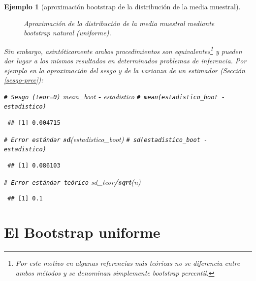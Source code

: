 \documentclass[
  spanish,
  10pt,
]{book}
\newenvironment{Shaded}{\begin{snugshade}}{\end{snugshade}}
\newcommand{\CommentTok}[1]{\textcolor[rgb]{0.56,0.35,0.01}{\textit{#1}}}
\newcommand{\FunctionTok}[1]{\textcolor[rgb]{0.13,0.29,0.53}{\textbf{#1}}}
\newcommand{\NormalTok}[1]{#1}
\newcommand{\SpecialCharTok}[1]{\textcolor[rgb]{0.81,0.36,0.00}{\textbf{#1}}}
\theoremstyle{break}
\newtheorem{example}{Ejemplo}[chapter]
\theoremstyle{nonumberplain}
\renewcommand{\CommentTok}[1]{\textcolor[rgb]{0.41,0.41,0.41}{\texttt{#1}}}
\let\oldfootnote\footnote
\renewcommand\footnote[1]{\oldfootnote{\hspace{2mm}#1}}
\begin{document}
\begin{example}[aproximación bootstrap de la distribución de la media muestral]
\begin{figure}[!htbp]
{}

\caption{Aproximación de la distribución de la media muestral mediante bootstrap natural (uniforme).}\label{fig:mean-boot-basico}
\end{figure}

Sin embargo, asintóticamente ambos procedimientos son equivalentes\footnote{Por este motivo en algunas referencias más teóricas no se diferencia entre ambos métodos y se denominan simplemente bootstrap percentil.} y pueden dar lugar a los mismos resultados en determinados problemas de inferencia.
Por ejemplo en la aproximación del sesgo y de la varianza de un estimador (Sección \ref{sesgo-prec}):

\begin{Shaded}
\begin{Highlighting}[]
\CommentTok{\# Sesgo (teor=0)}
\NormalTok{mean\_boot }\SpecialCharTok{{-}}\NormalTok{ estadistico }\CommentTok{\# mean(estadistico\_boot {-} estadistico)}
\end{Highlighting}
\end{Shaded}

\begin{verbatim}
 ## [1] 0.004715
\end{verbatim}

\begin{Shaded}
\begin{Highlighting}[]
\CommentTok{\# Error estándar}
\FunctionTok{sd}\NormalTok{(estadistico\_boot) }\CommentTok{\# sd(estadistico\_boot {-} estadistico)}
\end{Highlighting}
\end{Shaded}

\begin{verbatim}
 ## [1] 0.086103
\end{verbatim}

\begin{Shaded}
\begin{Highlighting}[]
\CommentTok{\# Error estándar teórico}
\NormalTok{sd\_teor}\SpecialCharTok{/}\FunctionTok{sqrt}\NormalTok{(n) }
\end{Highlighting}
\end{Shaded}

\begin{verbatim}
 ## [1] 0.1
\end{verbatim}

\end{example}

\section{El Bootstrap uniforme}\label{boot-unif}
\end{document}

